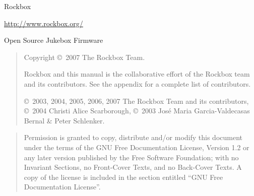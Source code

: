 %
%
%
%
%

%
{\begin{center}{\Large{Rockbox}}\end{center}}

\vspace{1cm}
\noindent
\begin{center}
\url{http://www.rockbox.org/}

\noindent
Open Source Jukebox Firmware
\end{center}

\vspace{6cm}
\begin{quote}
  \begin{center}
  Copyright \copyright~2007 The Rockbox Team.
  \end{center}
Rockbox and this manual is the collaborative effort of the
Rockbox team and its contributors. See the appendix for a complete list of
contributors.

\copyright~2003, 2004, 2005, 2006, 2007 The Rockbox Team and its contributors,
\copyright~2004 Christi Alice Scarborough,
\copyright~2003 Jos\'{e} Maria Garcia-Valdecasas Bernal \& Peter Schlenker.
\end{quote}

\vspace{\fill}
\begin{quote}
  Permission is granted to copy, distribute and/or modify this document
  under the terms of the GNU Free Documentation License, Version 1.2
  or any later version published by the Free Software Foundation;
  with no Invariant Sections, no Front-Cover Texts, and no Back-Cover Texts.
  A copy of the license is included in the section entitled ``GNU
  Free Documentation License''.
\end{quote}


